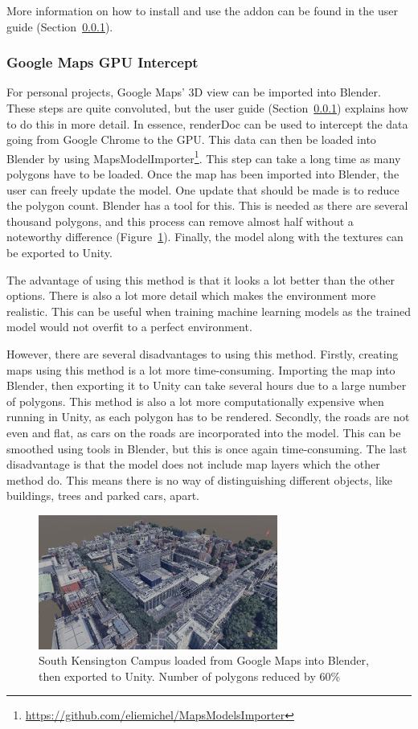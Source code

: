 More information on how to install and use the addon can be found in the user guide (Section~\ref{}).

\subsubsection{Google Maps GPU Intercept}
For personal projects, Google Maps' 3D view can be imported into Blender. These steps are quite convoluted, but the user guide (Section~\ref{}) explains how to do this in more detail. In essence, renderDoc can be used to intercept the data going from Google Chrome to the GPU. This data can then be loaded into Blender by using MapsModelImporter\footnote{\url{https://github.com/eliemichel/MapsModelsImporter}}. This step can take a long time as many polygons have to be loaded. Once the map has been imported into Blender, the user can freely update the model. One update that should be made is to reduce the polygon count. Blender has a tool for this. This is needed as there are several thousand polygons, and this process can remove almost half without a noteworthy difference (Figure~\ref{maps:figure:GoogleMaps}). Finally, the model along with the textures can be exported to Unity. 

The advantage of using this method is that it looks a lot better than the other options. There is also a lot more detail which makes the environment more realistic. This can be useful when training machine learning models as the trained model would not overfit to a perfect environment. 

However, there are several disadvantages to using this method. Firstly, creating maps using this method is a lot more time-consuming. Importing the map into Blender, then exporting it to Unity can take several hours due to a large number of polygons. This method is also a lot more computationally expensive when running in Unity, as each polygon has to be rendered. Secondly, the roads are not even and flat, as cars on the roads are incorporated into the model. This can be smoothed using tools in Blender, but this is once again time-consuming. The last disadvantage is that the model does not include map layers which the other method do. This means there is no way of distinguishing different objects, like buildings, trees and parked cars, apart. 

\begin{figure}[H]
    \centering
    \includegraphics[width=0.7\textwidth]{06_Implementation/00_Maps/Images/Google5Cropped.JPG}
    \caption[Map created using Google Maps]{South Kensington Campus loaded from Google Maps into Blender, then exported to Unity. Number of polygons reduced by 60\%}
    \label{maps:figure:GoogleMaps}
\end{figure}

